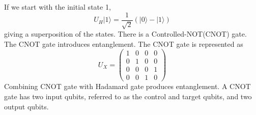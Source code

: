 \documentclass{Assignment}
\begin{document}
If we start with the initial state 1,
$$U_H|1\rangle = \frac{1}{\sqrt{2}}(|0 \rangle - |1\rangle)$$
giving a superposition of the states.
There is a Controlled-NOT(CNOT) gate.
\\
The CNOT gate introduces entanglement.
The CNOT gate is represented as 
\begin{equation}
	U_X = \begin{pmatrix}
		1&0&0&0\\
		0&1&0&0\\
		0&0&0&1\\
		0&0&1&0
	\end{pmatrix}
\end{equation}
Combining CNOT gate with Hadamard gate produces entanglement.
A CNOT gate has two input qubits, referred to as the control and target qubits, and two output qubits. \cite{mcintyre_quantum_2012}
\end{document}
